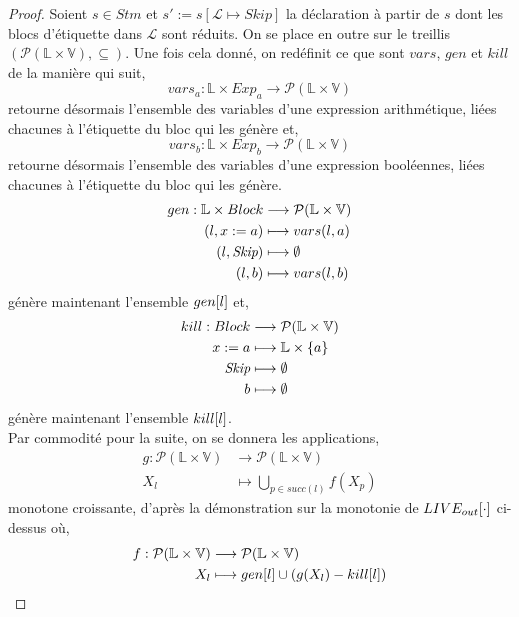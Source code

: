 \documentclass[a4paper, 11pt]{article}
\begin{document}
\begin{proof}
	Soient $s \in Stm$ et $s' := s[\mathcal{L} \longmapsto Skip]$ la déclaration à partir de $s$ dont les blocs d'étiquette 
	dans $\mathcal{L}$ sont réduits. 
	On se place en outre sur le treillis $(\mathcal{P}(\mathbb{L} \times \mathbb{V}), \subseteq)$. 
	Une fois cela donné, on redéfinit ce que sont $vars$, $gen$ et $kill$ de la manière qui suit, 
	\[vars_a : \mathbb{L} \times Exp_a \longrightarrow \mathcal{P}(\mathbb{L} \times \mathbb{V})\]
	retourne désormais l'ensemble des variables d'une expression arithmétique, liées chacunes à l'étiquette du bloc qui les génère et,
	\[vars_b : \mathbb{L} \times Exp_b \longrightarrow \mathcal{P}(\mathbb{L} \times \mathbb{V})\]
	retourne désormais l'ensemble des variables d'une expression booléennes, liées chacunes à l'étiquette du bloc qui les génère.
	\begin{align*}
		gen : \mathbb{L} \times Block &\longrightarrow \mathcal{P}(\mathbb{L} \times \mathbb{V})\\
		(l, {x}\space:=\space{a}) &\longmapsto vars(l, a)\\
		(l, \textit{Skip}) &\longmapsto \emptyset\\
		(l, b) &\longmapsto vars(l, b)
	\end{align*}
	génère maintenant l'ensemble $gen[l]$ et,
	\begin{align*}
		kill : Block &\longrightarrow \mathcal{P}(\mathbb{L} \times \mathbb{V})\\
		{x}\space:=\space{a} &\longmapsto \mathbb{L} \times \{a\}\\
		\textit{Skip} &\longmapsto \emptyset\\
		b &\longmapsto \emptyset
	\end{align*}
	génère maintenant l'ensemble $kill[l]$.
	\\ 
	Par commodité pour la suite, on se donnera les applications,
	\begin{align*}
		g : \mathcal{P}(\mathbb{L} \times \mathbb{V}) &\longrightarrow \mathcal{P}(\mathbb{L} \times \mathbb{V})\\
		X_l &\longmapsto \bigcup\limits_{p\in succ(l)} f(X_p)
	\end{align*}
	monotone croissante, d'après la démonstration sur la monotonie de $LIVE_{out}[\cdot]$ ci-dessus où,
	\begin{align*}
		f : \mathcal{P}(\mathbb{L} \times \mathbb{V}) &\longrightarrow \mathcal{P}(\mathbb{L} \times \mathbb{V})\\
		X_l &\longmapsto gen[l] \cup (g(X_l) - kill[l])
	\end{align*}

\end{proof}
\end{document}
